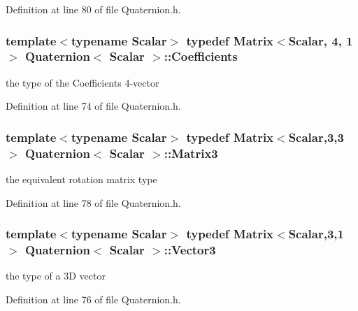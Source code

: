 Definition at line 80 of file Quaternion.\-h.

\hypertarget{class_quaternion_ad622be107fa0707a98a1966345f961a1}{
\subsubsection[{Coefficients}]{\setlength{\rightskip}{0pt plus 5cm}template$<$typename Scalar$>$ typedef {\bf Matrix}$<${\bf Scalar}, 4, 1$>$ {\bf Quaternion}$<$ {\bf Scalar} $>$\-::{\bf Coefficients}}}\label{class_quaternion_ad622be107fa0707a98a1966345f961a1}
the type of the Coefficients 4-\/vector 

Definition at line 74 of file Quaternion.\-h.

\hypertarget{class_quaternion_a9fb40d1207bd7f8f5e2fcfefb353c7ba}{
\subsubsection[{Matrix3}]{\setlength{\rightskip}{0pt plus 5cm}template$<$typename Scalar$>$ typedef {\bf Matrix}$<${\bf Scalar},3,3$>$ {\bf Quaternion}$<$ {\bf Scalar} $>$\-::{\bf Matrix3}}}\label{class_quaternion_a9fb40d1207bd7f8f5e2fcfefb353c7ba}
the equivalent rotation matrix type 

Definition at line 78 of file Quaternion.\-h.

\hypertarget{class_quaternion_a585d82ad2af10253cfcbd08241bc6ca2}{
\subsubsection[{Vector3}]{\setlength{\rightskip}{0pt plus 5cm}template$<$typename Scalar$>$ typedef {\bf Matrix}$<${\bf Scalar},3,1$>$ {\bf Quaternion}$<$ {\bf Scalar} $>$\-::{\bf Vector3}}}\label{class_quaternion_a585d82ad2af10253cfcbd08241bc6ca2}
the type of a 3\-D vector 

Definition at line 76 of file Quaternion.\-h.



